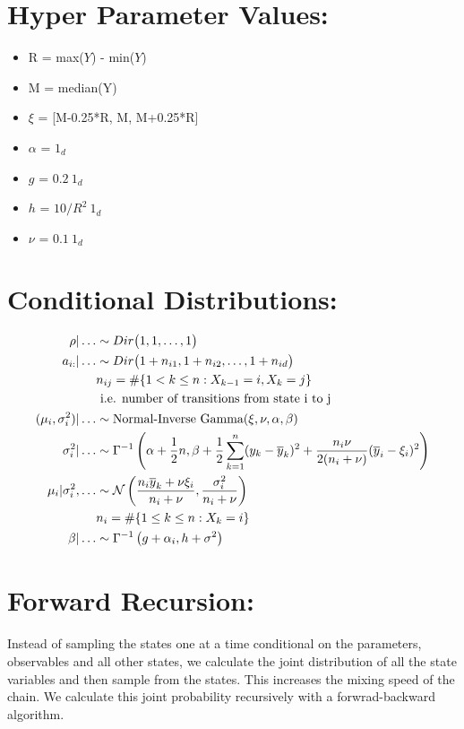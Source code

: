 \documentclass[12pt]{article}
\begin{document}
\section*{Hyper Parameter Values:} 
\begin{itemize}
  \item R = max($Y$) - min($Y$)
  \item M = median(Y)
  \item $\xi$ = [M-0.25*R, M, M+0.25*R] 
  \item $\alpha$ = $1_d$
  \item $g$ = $0.2  \ 1_d$
  \item $h$ = $10/R^2 \ 1_d$
  \item $\nu$ = $0.1 \ 1_d$
\end{itemize}


\section*{Conditional Distributions:}
\begin{align}
  \rho| \ldots &\sim Dir\big( 1, 1, \ldots, 1 \big) \\
  a_{i:}| \ldots &\sim Dir\big( 1+n_{i1}, 1+n_{i2}, \ldots, 1+n_{id} \big) \\
  &n_{ij} = \#\{ 1 < k \le n : X_{k-1} =i, X_k=j \} \nonumber \\
  &\text{ i.e. number of transitions from state i to j} \nonumber \\
  (\mu_i, \sigma^2_i) | \ldots &\sim \text{Normal-Inverse Gamma}(\xi, \nu, \alpha, \beta ) \\
  \sigma_i^2 | \ldots &\sim \Gamma^{-1}\left( \alpha+\frac{1}{2}n,\beta + \frac{1}{2} \sum_{k=1}^n(y_k - \overline{y}_k)^2 + 
  \frac{n_i \nu}{2(n_i + \nu)}(\overline{y}_i - \xi_i)^2 \right)\\
  \mu_i| \sigma_i^2, \ldots  & \sim \operatorname{\mathcal{N}}\left( \frac{n_i\overline{y}_k + \nu \xi_i}{n_i + \nu }, 
        \frac{\sigma_i^2}{n_i + \nu} \right) \\
  &n_i = \#\{ 1 \le k \le n: X_k = i\} \nonumber  \\
  \beta | \ldots &\sim  \Gamma^{-1}\left( g+\alpha_i, h + \sigma^2 \right)
\end{align}


\section*{Forward Recursion:}
Instead of sampling the states one at a time conditional on the parameters, 
observables and all other states, we calculate the joint distribution of all the
state variables and then sample from the states. This increases the mixing speed
of the chain. We calculate this joint probability recursively with a forwrad-backward
algorithm. 
\end{document}
